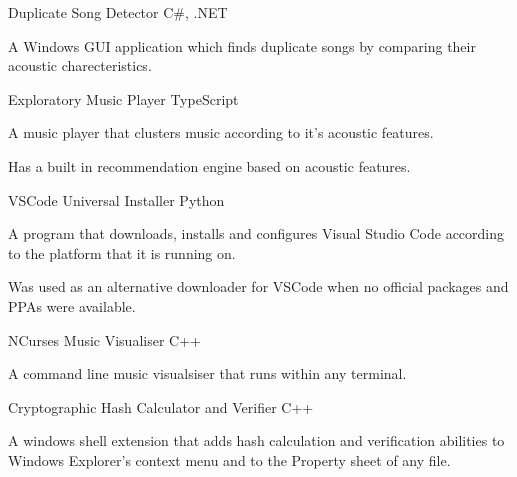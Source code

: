 \begin{projentries}
  \projentry%
    {Duplicate Song Detector} %
    {C\#, .NET} %
    {} %
    {%
      \begin{projitems} %
        \item{A Windows GUI application which finds duplicate songs by comparing their acoustic charecteristics.}
      \end{projitems}
    }

  \projentry%
    {Exploratory Music Player} %
    {TypeScript} %
    {} %
    {%
      \begin{projitems} %
        \item{A music player that clusters music according to it's acoustic features.}
        \item{Has a built in recommendation engine based on acoustic features.}
      \end{projitems}
    }

  \projentry%
    {VSCode Universal Installer} %
    {Python} %
    {} %
    {%
      \begin{projitems} %
        \item{A program that downloads, installs and configures Visual Studio Code according to the platform that it is running on.}
        \item{Was used as an alternative downloader for VSCode when no official packages and PPAs were available.}
      \end{projitems}
    }

  \projentry%
    {NCurses Music Visualiser} %
    {C++} %
    {} %
    {%
      \begin{projitems} %
        \item{A command line music visualsiser that runs within any terminal.}
      \end{projitems}
    }

  \projentry%
    {Cryptographic Hash Calculator and Verifier} %
    {C++} %
    {} %
    {%
      \begin{projitems} %
        \item{A windows shell extension that adds hash calculation and verification abilities to Windows Explorer's context menu and to the Property sheet of any file.}
      \end{projitems}
    }

\end{projentries}

